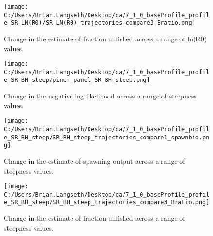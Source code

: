 \documentclass[11pt,
  english,
  a4paper,
]{article}
\begin{document}
\begin{figure}
\centering
\texttt{[image: C:/Users/Brian.Langseth/Desktop/ca/7\_1\_0\_baseProfile\_profile\_SR\_LN(R0)/SR\_LN(R0)\_trajectories\_compare3\_Bratio.png]}
\caption{Change in the estimate of fraction unfished across a range of ln(R0) values.\label{fig:r0-depl}}
\end{figure}

\tagmcend\tagstructend


\begin{figure}
\centering
\texttt{[image: C:/Users/Brian.Langseth/Desktop/ca/7\_1\_0\_baseProfile\_profile\_SR\_BH\_steep/piner\_panel\_SR\_BH\_steep.png]}
\caption{Change in the negative log-likelihood across a range of steepness values.\label{fig:h-profile}}
\end{figure}

\tagmcend\tagstructend


\begin{figure}
\centering
\texttt{[image: C:/Users/Brian.Langseth/Desktop/ca/7\_1\_0\_baseProfile\_profile\_SR\_BH\_steep/SR\_BH\_steep\_trajectories\_compare1\_spawnbio.png]}
\caption{Change in the estimate of spawning output across a range of steepness values.\label{fig:h-ssb}}
\end{figure}

\tagmcend\tagstructend


\begin{figure}
\centering
\texttt{[image: C:/Users/Brian.Langseth/Desktop/ca/7\_1\_0\_baseProfile\_profile\_SR\_BH\_steep/SR\_BH\_steep\_trajectories\_compare3\_Bratio.png]}
\caption{Change in the estimate of fraction unfished across a range of steepness values.\label{fig:h-depl}}
\end{figure}

\tagmcend\tagstructend

\end{document}
